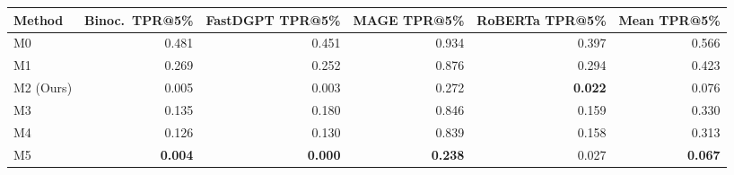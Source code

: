 \begin{tabular}{lrrrrr}
\toprule
Method & Binoc.\ TPR@5\% & FastDGPT TPR@5\% & MAGE TPR@5\% & RoBERTa TPR@5\% & Mean TPR@5\% \\
\midrule
M0 & 0.481 & 0.451 & 0.934 & 0.397 & 0.566 \\
M1 & 0.269 & 0.252 & 0.876 & 0.294 & 0.423 \\
M2 (Ours) & 0.005 & 0.003 & 0.272 & \textbf{0.022} & 0.076 \\
M3 & 0.135 & 0.180 & 0.846 & 0.159 & 0.330 \\
M4 & 0.126 & 0.130 & 0.839 & 0.158 & 0.313 \\
M5 & \textbf{0.004} & \textbf{0.000} & \textbf{0.238} & 0.027 & \textbf{0.067} \\
\bottomrule
\end{tabular}
